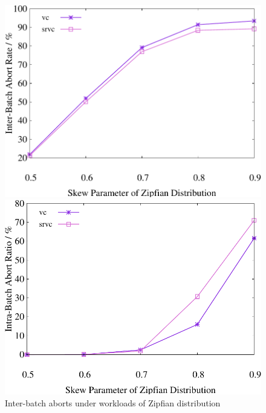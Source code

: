 \begin{figure}[t]
    \centering
    \begin{minipage}[b]{0.32\linewidth}
        \centering
        \includegraphics[width=\textwidth]{./exp_fig/basic/preabort}
        \vspace{-2em}
        \caption{Inter-batch aborts under workloads of Zipfian distribution}
        \label{fig:basic:preabort}
    \end{minipage}
    \begin{minipage}[b]{0.32\linewidth}
        \centering
        \includegraphics[width=\textwidth]{./exp_fig/basic/in_batch_abort}
        \vspace{-2em}

\end{minipage}
\end{figure}
